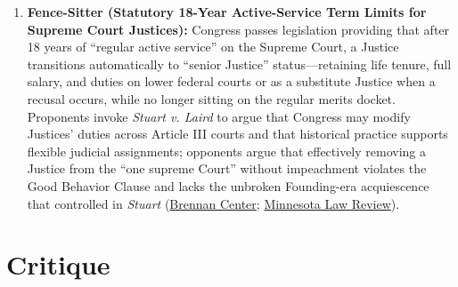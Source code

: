\documentclass[12pt]{article}
\begin{document}
\begin{enumerate}
\item \textbf{Fence-Sitter (Statutory 18-Year Active-Service Term Limits for Supreme Court Justices):} Congress passes legislation providing that after 18 years of ``regular active service'' on the Supreme Court, a Justice transitions automatically to ``senior Justice'' status---retaining life tenure, full salary, and duties on lower federal courts or as a substitute Justice when a recusal occurs, while no longer sitting on the regular merits docket. Proponents invoke \textit{Stuart v. Laird} to argue that Congress may modify Justices' duties across Article III courts and that historical practice supports flexible judicial assignments; opponents argue that effectively removing a Justice from the ``one supreme Court'' without impeachment violates the Good Behavior Clause and lacks the unbroken Founding-era acquiescence that controlled in \textit{Stuart} (\href{https://www.brennancenter.org/media/15940/download/bcj_constitutionality-of-supreme-court-term-limits.pdf?inline=1}{Brennan Center}; \href{https://scholarship.law.umn.edu/cgi/viewcontent.cgi?article=1032&context=mlr}{Minnesota Law Review}).
\end{enumerate}

\section{Critique}
\end{document}
